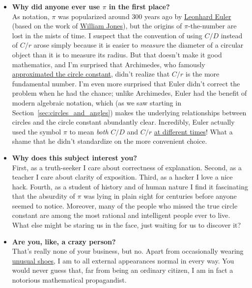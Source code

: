 {\begin{itemize}
  \item \textbf{Why did anyone ever use $\pi$ in the first place?} \\ As notation, $\pi$ was popularized around 300 years ago by \href{https://en.wikipedia.org/wiki/Leonhard_Euler}{Leonhard Euler} (based on the work of \href{https://en.wikipedia.org/wiki/William_Jones_(mathematician)}{William Jones}), but the origins of $\pi$-the-number are lost in the mists of time. I suspect that the convention of using $C/D$ instead of $C/r$ arose simply because it is easier to \emph{measure} the diameter of a circular object than it is to measure its radius. But that doesn't make it good mathematics, and I'm surprised that Archimedes, who famously \href{http://itech.fgcu.edu/faculty/clindsey/mhf4404/archimedes/archimedes.html}{approximated the circle constant}, didn't realize that $C/r$ is the more fundamental number. I'm even more surprised that Euler didn't correct the problem when he had the chance; unlike Archimedes, Euler had the benefit of modern algebraic notation, which (as we saw starting in Section~\ref{sec:circles_and_angles}) makes the underlying relationships between circles and the circle constant abundantly clear. Incredibly, Euler actually used the symbol $\pi$ to mean \emph{both} $C/D$ and $C/r$ \href{https://en.wikipedia.org/wiki/Pi#Adoption_of_the_symbol_%CF%80}{at different times}! What a shame that he didn't standardize on the more convenient choice.

  \item \textbf{Why does this subject interest you?} \\ First, as a truth-seeker I care about correctness of explanation. Second, as a teacher I care about clarity of exposition. Third, as a hacker I love a nice hack. Fourth, as a student of history and of human nature I find it fascinating that the absurdity of $\pi$ was lying in plain sight for centuries before anyone seemed to notice. Moreover, many of the people who missed the true circle constant are among the most rational and intelligent people ever to live. What else might be staring us in the face, just waiting for us to discover it?

  \item \textbf{Are you, like, a crazy person?} \\ That's really none of your business, but no. Apart from occasionally wearing \href{https://en.wikipedia.org/wiki/Vibram_FiveFingers}{unusual shoes}, I am to all external appearances normal in every way. You would never guess that, far from being an ordinary citizen, I am in fact a notorious mathematical propagandist.


\end{itemize}}

